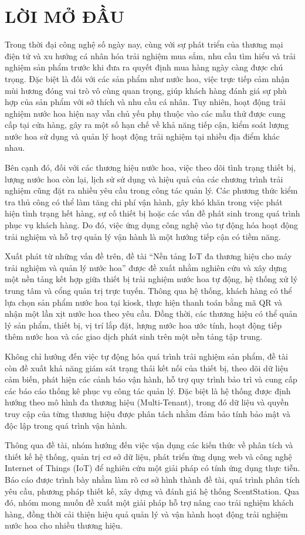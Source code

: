\chapter*{LỜI MỞ ĐẦU}

Trong thời đại công nghệ số ngày nay, cùng với sự phát triển của thương mại điện tử và xu hướng cá nhân hóa trải nghiệm mua sắm, nhu cầu tìm hiểu và trải nghiệm sản phẩm trước khi đưa ra quyết định mua hàng ngày càng được chú trọng. Đặc biệt là đối với các sản phẩm như nước hoa, việc trực tiếp cảm nhận mùi hương đóng vai trò vô cùng quan trọng, giúp khách hàng đánh giá sự phù hợp của sản phẩm với sở thích và nhu cầu cá nhân. Tuy nhiên, hoạt động trải nghiệm nước hoa hiện nay vẫn chủ yếu phụ thuộc vào các mẫu thử được cung cấp tại cửa hàng, gây ra một số hạn chế về khả năng tiếp cận, kiểm soát lượng nước hoa sử dụng và quản lý hoạt động trải nghiệm tại nhiều địa điểm khác nhau.

Bên cạnh đó, đối với các thương hiệu nước hoa, việc theo dõi tình trạng thiết bị, lượng nước hoa còn lại, lịch sử sử dụng và hiệu quả của các chương trình trải nghiệm cũng đặt ra nhiều yêu cầu trong công tác quản lý. Các phương thức kiểm tra thủ công có thể làm tăng chi phí vận hành, gây khó khăn trong việc phát hiện tình trạng hết hàng, sự cố thiết bị hoặc các vấn đề phát sinh trong quá trình phục vụ khách hàng. Do đó, việc ứng dụng công nghệ vào tự động hóa hoạt động trải nghiệm và hỗ trợ quản lý vận hành là một hướng tiếp cận có tiềm năng.

Xuất phát từ những vấn đề trên, đề tài “Nền tảng IoT đa thương hiệu cho máy trải nghiệm và quản lý nước hoa” được đề xuất nhằm nghiên cứu và xây dựng một nền tảng kết hợp giữa thiết bị trải nghiệm nước hoa tự động, hệ thống xử lý trung tâm và cổng quản trị trực tuyến. Thông qua hệ thống, khách hàng có thể lựa chọn sản phẩm nước hoa tại kiosk, thực hiện thanh toán bằng mã QR và nhận một lần xịt nước hoa theo yêu cầu. Đồng thời, các thương hiệu có thể quản lý sản phẩm, thiết bị, vị trí lắp đặt, lượng nước hoa ước tính, hoạt động tiếp thêm nước hoa và các giao dịch phát sinh trên một nền tảng tập trung.

Không chỉ hướng đến việc tự động hóa quá trình trải nghiệm sản phẩm, đề tài còn đề xuất khả năng giám sát trạng thái kết nối của thiết bị, theo dõi dữ liệu cảm biến, phát hiện các cảnh báo vận hành, hỗ trợ quy trình bảo trì và cung cấp các báo cáo thống kê phục vụ công tác quản lý. Đặc biệt là hệ thống được định hướng theo mô hình đa thương hiệu (Multi-Tenant), trong đó dữ liệu và quyền truy cập của từng thương hiệu được phân tách nhằm đảm bảo tính bảo mật và độc lập trong quá trình vận hành.

Thông qua đề tài, nhóm hướng đến việc vận dụng các kiến thức về phân tích và thiết kế hệ thống, quản trị cơ sở dữ liệu, phát triển ứng dụng web và công nghệ Internet of Things (IoT) để nghiên cứu một giải pháp có tính ứng dụng thực tiễn. Báo cáo được trình bày nhằm làm rõ cơ sở hình thành đề tài, quá trình phân tích yêu cầu, phương pháp thiết kế, xây dựng và đánh giá hệ thống ScentStation. Qua đó, nhóm mong muốn đề xuất một giải pháp hỗ trợ nâng cao trải nghiệm khách hàng, đồng thời cải thiện hiệu quả quản lý và vận hành hoạt động trải nghiệm nước hoa cho nhiều thương hiệu.
